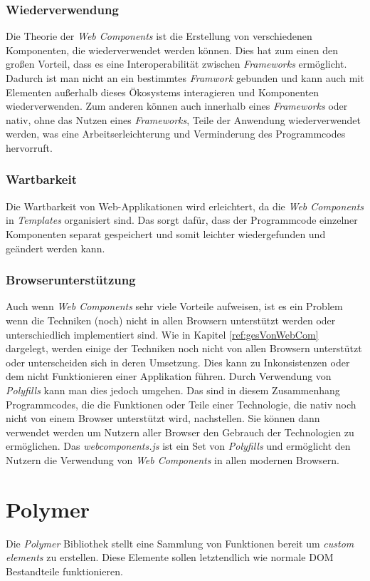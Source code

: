 \documentclass[12pt, paper=a4, bibtotoc, toc=listof, headsepline=true]{scrreprt}
\begin{document}
			\subsection{Wiederverwendung}
			Die Theorie der \emph{Web Components} ist die Erstellung von verschiedenen Komponenten, die wiederverwendet werden können. Dies hat zum einen den großen Vorteil, dass es eine Interoperabilität zwischen \emph{Frameworks} ermöglicht\cite[S.2]{patel2015learning}. Dadurch ist man nicht an ein bestimmtes \emph{Framwork} gebunden und kann auch mit Elementen außerhalb dieses Ökosystems interagieren und Komponenten wiederverwenden. Zum anderen können auch innerhalb eines \emph{Frameworks} oder nativ, ohne das Nutzen eines \emph{Frameworks}, Teile der Anwendung wiederverwendet werden, was eine Arbeitserleichterung und Verminderung des Programmcodes hervorruft. 
			\subsection{Wartbarkeit}
			Die Wartbarkeit von Web-Applikationen wird erleichtert, da die \emph{Web Components} in \emph{Templates} organisiert sind\cite[S.2]{patel2015learning}. Das sorgt dafür, dass der Programmcode einzelner Komponenten separat gespeichert und somit leichter wiedergefunden und geändert werden kann.
			\subsection{Browserunterstützung}
			Auch wenn \emph{Web Components} sehr viele Vorteile aufweisen, ist es ein Problem wenn die Techniken (noch) nicht in allen Browsern unterstützt werden oder unterschiedlich implementiert sind. Wie in Kapitel \ref{ref:gesVonWebCom} dargelegt, werden einige der Techniken noch nicht von allen Browsern unterstützt oder unterscheiden sich in deren Umsetzung. Dies kann zu Inkonsistenzen oder dem nicht Funktionieren einer Applikation führen. Durch Verwendung von  \emph{Polyfills} kann man dies jedoch umgehen. Das sind in diesem Zusammenhang Programmcodes, die die Funktionen oder Teile einer Technologie, die nativ noch nicht von einem Browser unterstützt wird, nachstellen. Sie können dann verwendet werden um Nutzern aller Browser den Gebrauch der Technologien zu ermöglichen\cite[S.4]{satrom2014building}. Das \emph{webcomponents.js} ist ein Set von \emph{Polyfills} und ermöglicht den Nutzern die Verwendung von \emph{Web Components} in allen modernen Browsern\cite{webComJs}.
\chapter{Polymer}
Die \emph{Polymer} Bibliothek stellt eine Sammlung von Funktionen bereit um \emph{custom elements} zu erstellen. Diese Elemente sollen letztendlich wie normale \ac{DOM} Bestandteile funktionieren\cite{polymerFeaOve}.
\end{document}

